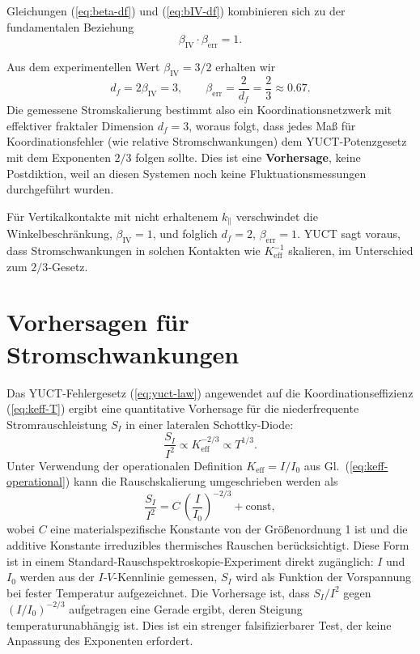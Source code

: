 \documentclass[12pt,a4paper]{article}
\newcommand{\Keff}{K_{\mathrm{eff}}}
\begin{document}
	Gleichungen (\ref{eq:beta-df}) und (\ref{eq:bIV-df}) kombinieren sich zu
	der fundamentalen Beziehung
	\begin{equation}
		\boxed{\beta_{\mathrm{IV}} \cdot \beta_{\mathrm{err}} = 1}.
		\label{eq:relation}
	\end{equation}
	
	Aus dem experimentellen Wert $\beta_{\mathrm{IV}} = 3/2$ erhalten wir
	\begin{equation}
		d_f = 2\beta_{\mathrm{IV}} = 3, \qquad
		\beta_{\mathrm{err}} = \frac{2}{d_f} = \frac{2}{3} \approx 0.67.
	\end{equation}
	Die gemessene Stromskalierung bestimmt also ein Koordinationsnetzwerk mit
	effektiver fraktaler Dimension $d_f = 3$, woraus folgt, dass jedes Maß für
	Koordinationsfehler (wie relative Stromschwankungen) dem YUCT‑Potenzgesetz
	mit dem Exponenten $2/3$ folgen sollte. Dies ist eine \textbf{Vorhersage},
	keine Postdiktion, weil an diesen Systemen noch keine Fluktuationsmessungen
	durchgeführt wurden.
	
	Für Vertikalkontakte mit nicht erhaltenem $k_\parallel$ verschwindet die
	Winkelbeschränkung, $\beta_{\mathrm{IV}} = 1$, und folglich $d_f = 2$,
	$\beta_{\mathrm{err}} = 1$. YUCT sagt voraus, dass Stromschwankungen in
	solchen Kontakten wie $\Keff^{-1}$ skalieren, im Unterschied zum $2/3$‑Gesetz.
	
	\section{Vorhersagen für Stromschwankungen}
	\label{sec:predictions}
	Das YUCT‑Fehlergesetz (\ref{eq:yuct-law}) angewendet auf die
	Koordinationseffizienz (\ref{eq:keff-T}) ergibt eine quantitative Vorhersage
	für die niederfrequente Stromrauschleistung $S_I$ in einer lateralen
	Schottky‑Diode:
	\begin{equation}
		\frac{S_I}{I^2} \propto \Keff^{-2/3} \propto T^{1/3}.
		\label{eq:noise-pred}
	\end{equation}
	Unter Verwendung der operationalen Definition $\Keff = I/I_0$ aus
	Gl.~(\ref{eq:keff-operational}) kann die Rauschskalierung umgeschrieben werden als
	\begin{equation}
		\frac{S_I}{I^2} = C \, \left(\frac{I}{I_0}\right)^{-2/3} + \text{const},
		\label{eq:noise-operational}
	\end{equation}
	wobei $C$ eine materialspezifische Konstante von der Größenordnung 1 ist und
	die additive Konstante irreduzibles thermisches Rauschen berücksichtigt. Diese
	Form ist in einem Standard‑Rauschspektroskopie‑Experiment direkt zugänglich:
	$I$ und $I_0$ werden aus der $I$‑$V$-Kennlinie gemessen, $S_I$ wird als
	Funktion der Vorspannung bei fester Temperatur aufgezeichnet. Die Vorhersage
	ist, dass $S_I/I^2$ gegen $(I/I_0)^{-2/3}$ aufgetragen eine Gerade ergibt,
	deren Steigung temperaturunabhängig ist. Dies ist ein strenger falsifizierbarer
	Test, der keine Anpassung des Exponenten erfordert.
	
\end{document}
